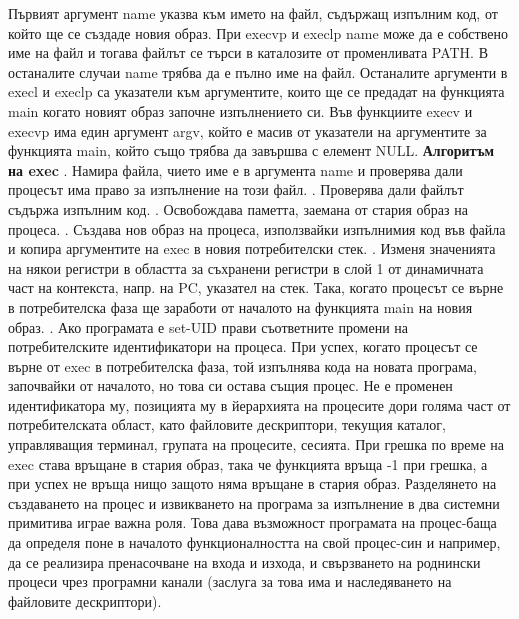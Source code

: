 \documentclass{article}
\begin{document}
Първият аргумент name указва към името на файл, съдържащ изпълним код, от който ще се създаде новия образ. При execvp и execlp
name може да е собствено име на файл и тогава файлът се търси в каталозите от променливата PATH. В останалите случаи name трябва
да е пълно име на файл. Останалите аргументи в execl и execlp са указатели към аргументите, които ще се предадат на функцията
main когато новият образ започне изпълнението си. Във функциите execv и execvp има един аргумент argv, който е масив от указатели
на аргументите за функцията main, който също трябва да завършва с елемент NULL. \newline\newline
\textbf{Алгоритъм на exec} \newline{}. Намира файла, чието име е в аргумента name и проверява дали процесът има право за изпълнение на този файл. . Проверява дали файлът съдържа изпълним код. . Освобождава паметта, заемана от стария образ на процеса. . Създава нов образ на процеса, използвайки изпълнимия код във файла и копира аргументите на exec в новия потребителски стек. . Изменя значенията на някои регистри в областта за съхранени регистри в слой 1 от динамичната част на контекста, напр. на PC,
указател на стек. Така, когато процесът се върне в потребителска фаза ще заработи от началото на функцията main на новия образ. . Ако програмата е set-UID прави съответните промени на потребителските идентификатори на процеса. \newline
При успех, когато процесът се върне от exec в потребителска фаза, той изпълнява кода на новата програма, започвайки от началото,
но това си остава същия процес. Не е променен идентификатора му, позицията му в йерархията на процесите дори голяма част от
потребителската област, като файловите дескриптори, текущия каталог, управляващия терминал, групата на процесите, сесията. При
грешка по време на exec става връщане в стария образ, така че функцията връща -1 при грешка, а при успех не връща нищо защото
няма връщане в стария образ. \newline Разделянето на създаването на процес и извикването на програма за изпълнение в два системни
примитива играе важна роля. Това дава възможност програмата на процес-баща да определя поне в началото функционалността на свой
процес-син и например, да се реализира пренасочване на входа и изхода, и свързването на роднински процеси чрез програмни канали
(заслуга за това има и наследяването на файловите дескриптори).
\end{document}
